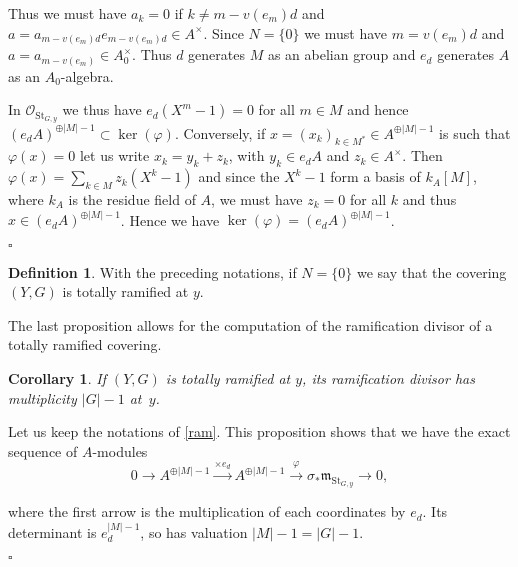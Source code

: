 \documentclass{amsart}
\newenvironment{demo}{{\flushleft \bf Proof~:}}{\hfill $\square$ \vspace{5mm}}
\newtheorem{coro}{Corollary}[section]
\theoremstyle{definition}
\newtheorem{defi}{Definition}[section]
\theoremstyle{remark}
\begin{document}
\begin{demo}
Thus we must have $a_k = 0$ if $k \neq m - v(e_m)d$ and $a = a_{m-v(e_m)d}e_{m-v(e_m)d} \in A^{\times}$. Since $N = \{0 \}$ we must have $m=v(e_m)d$ and $a=a_{m-v(e_m)} \in A_0^\times$. Thus $d$ generates $M$ as an abelian group and $e_d$ generates $A$ as an $A_0$-algebra.  

In ${{\mathcal O}}_{\operatorname{St}_{G,y}}$ we thus have $e_d(X^m-1) = 0$ for all $m \in M$ and hence $(e_dA)^{\oplus \vert M \vert -1} \subset \ker(\varphi)$. Conversely, if $x=(x_k)_{k \in M^*} \in A^{\oplus \vert M \vert -1}$ is such that $\varphi(x) = 0$ let us write $x_k = y_k + z_k$, with $y_k \in e_dA$ and $z_k \in A^\times$. Then $\varphi(x) = \displaystyle\sum_{k \in M} z_k(X^k-1)$ and since the $X^k-1$ form a basis of $k_A[M]$, where $k_A$ is the residue field of $A$, we must have $z_k = 0$ for all $k$ and thus $x \in (e_dA)^{\oplus \vert M \vert -1 }$. Hence we have $\ker(\varphi) = (e_dA)^{\oplus \vert M \vert -1}$.  

\end{demo}

\begin{defi}

\label{totram}
With the preceding notations, if $N=\{0 \}$ we say that the covering $(Y,G)$ is totally ramified at $y$. 

\end{defi}

The last proposition allows for the computation of the ramification divisor of a totally ramified covering.

\begin{coro}

If $(Y,G)$ is totally ramified at $y$, its ramification divisor has multiplicity $\vert G \vert - 1$ at~$y$. 

\end{coro}

\begin{demo}

Let us keep the notations of \ref{ram}. This proposition shows that we have the exact sequence of $A$-modules  \[ 0 {\longrightarrow} A^{\oplus |M|-1} \stackrel{\times e_d}{\longrightarrow} A^{\oplus |M|-1} \stackrel{\varphi}{\longrightarrow} \sigma_* {{\mathfrak m}}_{\operatorname{St}_{G,y}} {\longrightarrow} 0, \]

where the first arrow is the multiplication of each coordinates by $e_d$. Its determinant is $e_d^{\vert M \vert - 1}$, so has valuation $\vert M \vert -1 = \vert G \vert -1$. 

\end{demo}
\end{document}
